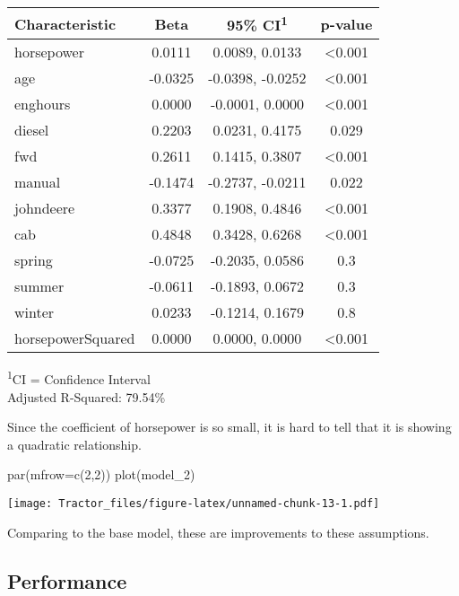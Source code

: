 \documentclass[
]{article}
\newenvironment{Shaded}{\begin{snugshade}}{\end{snugshade}}
\newcommand{\AttributeTok}[1]{\textcolor[rgb]{0.77,0.63,0.00}{#1}}
\newcommand{\DecValTok}[1]{\textcolor[rgb]{0.00,0.00,0.81}{#1}}
\newcommand{\FunctionTok}[1]{\textcolor[rgb]{0.00,0.00,0.00}{#1}}
\newcommand{\NormalTok}[1]{#1}
\begin{document}
\setlength{\LTpost}{0mm}
\begin{longtable}{lccc}
\toprule
\textbf{Characteristic} & \textbf{Beta} & \textbf{95\% CI}\textsuperscript{1} & \textbf{p-value} \\ 
\midrule
horsepower & 0.0111 & 0.0089, 0.0133 & <0.001 \\ 
age & -0.0325 & -0.0398, -0.0252 & <0.001 \\ 
enghours & 0.0000 & -0.0001, 0.0000 & <0.001 \\ 
diesel & 0.2203 & 0.0231, 0.4175 & 0.029 \\ 
fwd & 0.2611 & 0.1415, 0.3807 & <0.001 \\ 
manual & -0.1474 & -0.2737, -0.0211 & 0.022 \\ 
johndeere & 0.3377 & 0.1908, 0.4846 & <0.001 \\ 
cab & 0.4848 & 0.3428, 0.6268 & <0.001 \\ 
spring & -0.0725 & -0.2035, 0.0586 & 0.3 \\ 
summer & -0.0611 & -0.1893, 0.0672 & 0.3 \\ 
winter & 0.0233 & -0.1214, 0.1679 & 0.8 \\ 
horsepowerSquared & 0.0000 & 0.0000, 0.0000 & <0.001 \\ 
\bottomrule
\end{longtable}
\begin{minipage}{\linewidth}
\textsuperscript{1}CI = Confidence Interval\\
Adjusted R-Squared: 79.54\%\\
\end{minipage}

Since the coefficient of horsepower is so small, it is hard to tell that
it is showing a quadratic relationship.

\begin{Shaded}
\begin{Highlighting}[]
\FunctionTok{par}\NormalTok{(}\AttributeTok{mfrow=}\FunctionTok{c}\NormalTok{(}\DecValTok{2}\NormalTok{,}\DecValTok{2}\NormalTok{))}
\FunctionTok{plot}\NormalTok{(model\_2)}
\end{Highlighting}
\end{Shaded}

\texttt{[image: Tractor\_files/figure-latex/unnamed-chunk-13-1.pdf]}

Comparing to the base model, these are improvements to these
assumptions.

\hypertarget{performance}{%
\subsection{Performance}\label{performance}}
\end{document}

